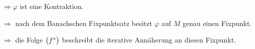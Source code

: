 \documentclass{scrreprt}
\begin{document}
\begin{enumerate}[(i)]
  $\Rightarrow \varphi$ ist eine Kontraktion.

  $\Rightarrow$ nach dem Banachschen Fixpunktsatz besitzt $\varphi$ auf $M$
  genau einen Fixpunkt.

  $\Rightarrow$ die Folge $\qty\big(f^*)$ beschreibt die iterative Annäherung an
  diesen Fixpunkt.

\end{enumerate}
\end{document}
